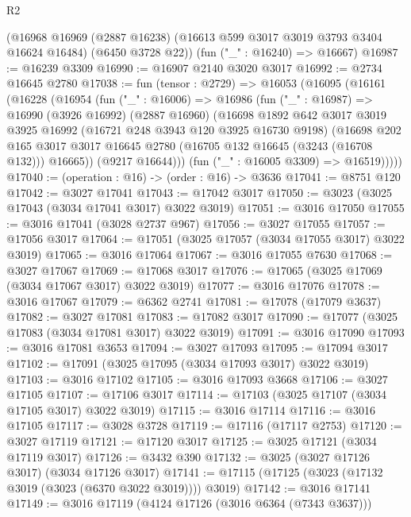 \begin{lexlean}{R2}
\begin{coremodule}
    (@16968
      @16969
      (@2887 @16238)
      (@16613 @599 @3017 @3019 @3793 @3404 @16624 @16484)
      (@6450 @3728 @22))
    (fun ("_" : @16240) => @16667)
@16987 := @16239 @3309
@16990 := @16907 @2140 @3020 @3017
@16992 := @2734 @16645 @2780
@17038 := fun (tensor : @2729) =>
  @16053
    (@16095
      (@16161
        (@16228
          (@16954
            (fun ("_" : @16006) =>
            @16986
              (fun ("_" : @16987) =>
              @16990
                (@3926 @16992)
                (@2887 @16960)
                (@16698
                  @1892
                  @642
                  @3017
                  @3019
                  @3925
                  @16992
                  (@16721 @248 @3943 @120 @3925 @16730 @9198)
                  (@16698
                    @202
                    @165
                    @3017
                    @3017
                    @16645
                    @2780
                    (@16705 @132 @16645 (@3243 (@16708 @132)))
                    @16665))
                (@9217 @16644)))
            (fun ("_" : @16005 @3309) => @16519)))))
@17040 := (operation : @16) -> (order : @16) -> @3636
@17041 := @8751 @120
@17042 := @3027 @17041
@17043 := @17042 @3017
@17050 := @3023 (@3025 @17043 (@3034 @17041 @3017) @3022 @3019)
@17051 := @3016 @17050
@17055 := @3016 @17041 (@3028 @2737 @967)
@17056 := @3027 @17055
@17057 := @17056 @3017
@17064 := @17051 (@3025 @17057 (@3034 @17055 @3017) @3022 @3019)
@17065 := @3016 @17064
@17067 := @3016 @17055 @7630
@17068 := @3027 @17067
@17069 := @17068 @3017
@17076 := @17065 (@3025 @17069 (@3034 @17067 @3017) @3022 @3019)
@17077 := @3016 @17076
@17078 := @3016 @17067
@17079 := @6362 @2741
@17081 := @17078 (@17079 @3637)
@17082 := @3027 @17081
@17083 := @17082 @3017
@17090 := @17077 (@3025 @17083 (@3034 @17081 @3017) @3022 @3019)
@17091 := @3016 @17090
@17093 := @3016 @17081 @3653
@17094 := @3027 @17093
@17095 := @17094 @3017
@17102 := @17091 (@3025 @17095 (@3034 @17093 @3017) @3022 @3019)
@17103 := @3016 @17102
@17105 := @3016 @17093 @3668
@17106 := @3027 @17105
@17107 := @17106 @3017
@17114 := @17103 (@3025 @17107 (@3034 @17105 @3017) @3022 @3019)
@17115 := @3016 @17114
@17116 := @3016 @17105
@17117 := @3028 @3728
@17119 := @17116 (@17117 @2753)
@17120 := @3027 @17119
@17121 := @17120 @3017
@17125 := @3025 @17121 (@3034 @17119 @3017)
@17126 := @3432 @390
@17132 := @3025 (@3027 @17126 @3017) (@3034 @17126 @3017)
@17141 := @17115 (@17125 (@3023 (@17132 @3019 (@3023 (@6370 @3022 @3019)))) @3019)
@17142 := @3016 @17141
@17149 := @3016 @17119 (@4124 @17126 (@3016 @6364 (@7343 @3637)))

\end{coremodule}
\end{lexlean}
